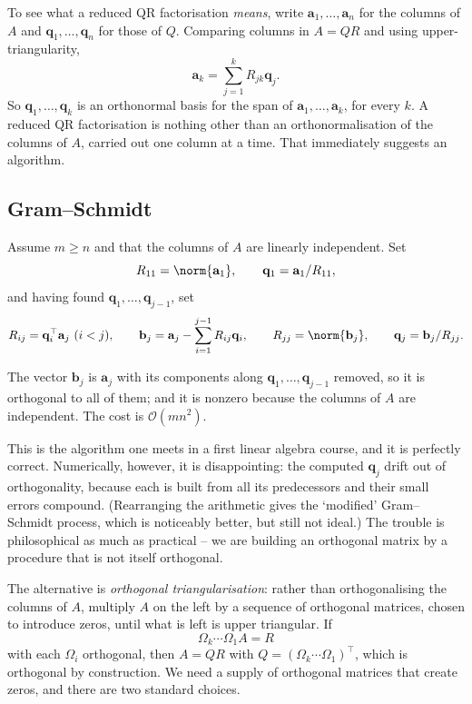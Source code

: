 \documentclass[a4paper]{scrartcl}
\begin{document}
To see what a reduced QR factorisation \emph{means}, write $\mathbf{a}_1, \dots, \mathbf{a}_n$ for the columns of $A$ and $\mathbf{q}_1, \dots, \mathbf{q}_n$ for those of $Q$. Comparing columns in $A = QR$ and using upper-triangularity,
$$
\mathbf{a}_k = \sum_{j=1}^{k}R_{jk}\mathbf{q}_j .
$$
So $\mathbf{q}_1, \dots, \mathbf{q}_k$ is an orthonormal basis for the span of $\mathbf{a}_1, \dots, \mathbf{a}_k$, for every $k$. A reduced QR factorisation is nothing other than an orthonormalisation of the columns of $A$, carried out one column at a time. That immediately suggests an algorithm.

\subsection{Gram--Schmidt}

\begin{method}
  Assume $m \geq n$ and that the columns of $A$ are linearly independent. Set
  $$
  R_{11} = \norm{\mathbf{a}_1}, \qquad \mathbf{q}_1 = \mathbf{a}_1/R_{11},
  $$
  and having found $\mathbf{q}_1, \dots, \mathbf{q}_{j-1}$, set
  $$
  R_{ij} = \mathbf{q}_i^\top\mathbf{a}_j \ (i < j), \qquad \mathbf{b}_j = \mathbf{a}_j - \sum_{i=1}^{j-1}R_{ij}\mathbf{q}_i, \qquad R_{jj} = \norm{\mathbf{b}_j}, \qquad \mathbf{q}_j = \mathbf{b}_j/R_{jj}.
  $$
\end{method}

The vector $\mathbf{b}_j$ is $\mathbf{a}_j$ with its components along $\mathbf{q}_1, \dots, \mathbf{q}_{j-1}$ removed, so it is orthogonal to all of them; and it is nonzero because the columns of $A$ are independent. The cost is $\mathcal{O}(mn^2)$.

This is the algorithm one meets in a first linear algebra course, and it is perfectly correct. Numerically, however, it is disappointing: the computed $\mathbf{q}_j$ drift out of orthogonality, because each is built from all its predecessors and their small errors compound. (Rearranging the arithmetic gives the `modified' Gram--Schmidt process, which is noticeably better, but still not ideal.) The trouble is philosophical as much as practical -- we are building an orthogonal matrix by a procedure that is not itself orthogonal.

The alternative is \emph{orthogonal triangularisation}: rather than orthogonalising the columns of $A$, multiply $A$ on the left by a sequence of orthogonal matrices, chosen to introduce zeros, until what is left is upper triangular. If
$$
\Omega_k \cdots \Omega_1 A = R
$$
with each $\Omega_i$ orthogonal, then $A = QR$ with $Q = (\Omega_k\cdots\Omega_1)^\top$, which is orthogonal by construction. We need a supply of orthogonal matrices that create zeros, and there are two standard choices.
\end{document}
